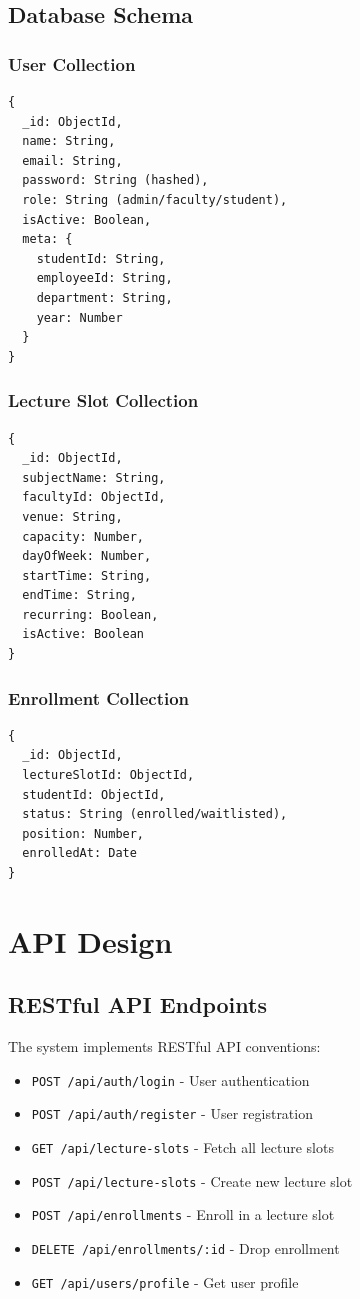 \documentclass[12pt,a4paper]{report}
\begin{document}
\subsection{Database Schema}

\subsubsection{User Collection}
\begin{verbatim}
{
  _id: ObjectId,
  name: String,
  email: String,
  password: String (hashed),
  role: String (admin/faculty/student),
  isActive: Boolean,
  meta: {
    studentId: String,
    employeeId: String,
    department: String,
    year: Number
  }
}
\end{verbatim}

\subsubsection{Lecture Slot Collection}
\begin{verbatim}
{
  _id: ObjectId,
  subjectName: String,
  facultyId: ObjectId,
  venue: String,
  capacity: Number,
  dayOfWeek: Number,
  startTime: String,
  endTime: String,
  recurring: Boolean,
  isActive: Boolean
}
\end{verbatim}

\subsubsection{Enrollment Collection}
\begin{verbatim}
{
  _id: ObjectId,
  lectureSlotId: ObjectId,
  studentId: ObjectId,
  status: String (enrolled/waitlisted),
  position: Number,
  enrolledAt: Date
}
\end{verbatim}

\section{API Design}

\subsection{RESTful API Endpoints}
The system implements RESTful API conventions:
\begin{itemize}[leftmargin=*]
    \item \texttt{POST /api/auth/login} - User authentication
    \item \texttt{POST /api/auth/register} - User registration
    \item \texttt{GET /api/lecture-slots} - Fetch all lecture slots
    \item \texttt{POST /api/lecture-slots} - Create new lecture slot
    \item \texttt{POST /api/enrollments} - Enroll in a lecture slot
    \item \texttt{DELETE /api/enrollments/:id} - Drop enrollment
    \item \texttt{GET /api/users/profile} - Get user profile
\end{itemize}
\end{document}
